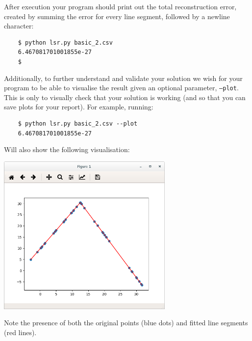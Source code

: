 \documentclass[10pt]{article}
\begin{document}
After execution your program should print out the total reconstruction error, created by summing the error for every line segment, followed by a newline character:

\begin{verbatim}
    $ python lsr.py basic_2.csv
    6.467081701001855e-27
    $
\end{verbatim}

Additionally, to further understand and validate your solution we wish for your program to be able to visualise the result given an optional parameter, \texttt{--plot}.
This is only to visually check that your solution is working (and so that you can save plots for your report).
For example, running:

\begin{verbatim}
    $ python lsr.py basic_2.csv --plot
    6.467081701001855e-27
\end{verbatim}

Will also show the following visualisation:

\includegraphics[width=0.65\textwidth]{CW1_visualisation}

Note the presence of both the original points (blue dots) and fitted line segments (red lines).
\end{document}

